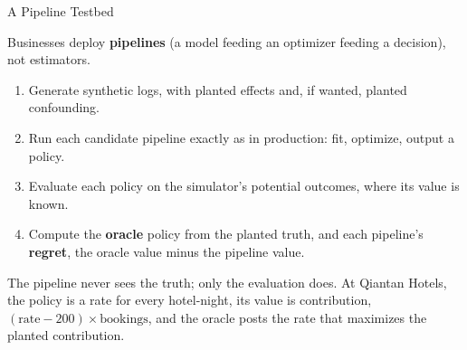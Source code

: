 \documentclass[aspectratio=169, 11pt, handout]{beamer}
\begin{document}
\begin{frame}{A Pipeline Testbed}

Businesses deploy \textbf{pipelines} (a model feeding an optimizer feeding a decision), not estimators.
\begin{enumerate}
  \item Generate synthetic logs, with planted effects and, if wanted, planted confounding.
  \item Run each candidate pipeline exactly as in production: fit, optimize, output a policy.
  \item Evaluate each policy on the simulator's potential outcomes, where its value is known.
  \item Compute the \textbf{oracle} policy from the planted truth, and each pipeline's \textbf{regret}, the oracle value minus the pipeline value.
\end{enumerate}

\begin{center}
\end{center}

\small The pipeline never sees the truth; only the evaluation does. At Qiantan Hotels, the policy is a rate for every hotel-night, its value is contribution, $(\text{rate} - 200) \times \text{bookings}$, and the oracle posts the rate that maximizes the planted contribution.
\end{frame}
\end{document}
